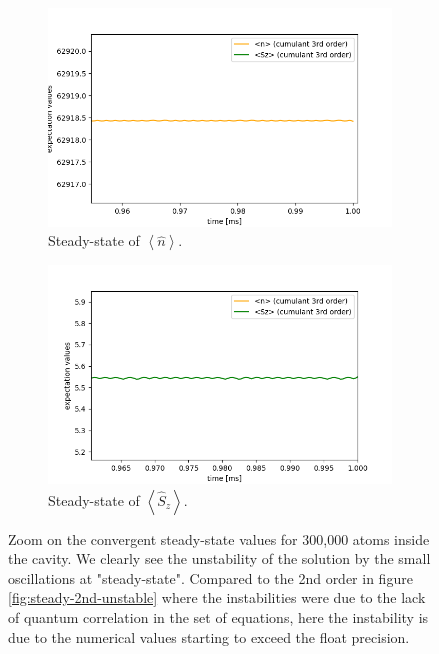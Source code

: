 \documentclass[11pt]{report}
\begin{document}
\begin{figure}[h!]
\centering
\begin{subfigure}{.48\textwidth}
  \centering
  \includegraphics[width=1\linewidth]{300k_3_nsz_zoom_3}
  \caption{Steady-state of $\left\langle \hat{n} \right\rangle$.}
\end{subfigure}%
\hspace{1em}%
\begin{subfigure}{.48\textwidth}
  \centering
  \includegraphics[width=1\linewidth]{300k_3_nsz_zoom_2}
  \caption{Steady-state of $\left\langle \hat{S}_z \right\rangle$.}
\end{subfigure}
\caption{Zoom on the convergent steady-state values for 300,000 atoms inside the cavity. We clearly see the unstability of the solution by the small oscillations at "steady-state". Compared to the 2nd order in figure \ref{fig:steady-2nd-unstable} where the instabilities were due to the lack of quantum correlation in the set of equations, here the instability is due to the numerical values starting to exceed the float precision.}
\end{figure}
\end{document}
